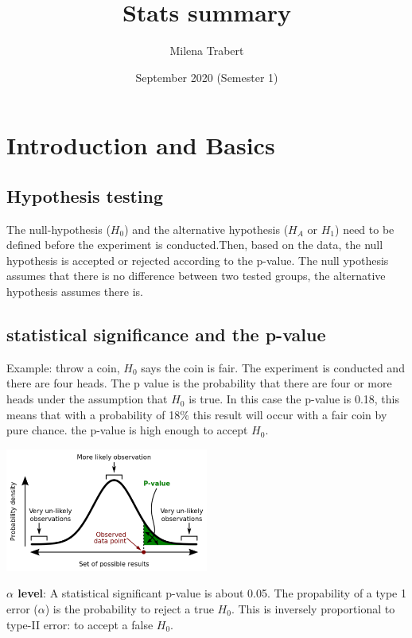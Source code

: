 \documentclass{article}
\title{Stats summary}
\author{Milena Trabert}
\date{September 2020 (Semester 1)}
\begin{document}
\maketitle
\tableofcontents
\newpage

\section{Introduction and Basics}
\subsection{Hypothesis testing}
The null-hypothesis ($H_0$) and the alternative hypothesis ($H_A$ or $H_1$) need to be defined before the experiment is conducted.Then, based on the data, the null hypothesis is accepted or rejected according to the p-value. The null ypothesis assumes that there is no difference between two tested groups, the alternative hypothesis assumes there is.
\subsection{statistical significance and the p-value}
Example: throw a coin, $H_0$ says the coin is fair. The experiment is conducted and there are four heads. The p value is the probability that there are four or more heads under the assumption that $H_0$ is true. In this case the p-value is 0.18, this means that with a probability of 18\% this result will occur with a fair coin by pure chance. the p-value is high enough to accept $H_0$.
\begin{center}
    \includegraphics[width=0.5\textwidth]{intro/p-value.png}
\end{center}
\textbf{$\alpha$ level}: A statistical significant p-value is about 0.05. The propability of a type 1 error ($\alpha$) is the probability to reject a true $H_0$. This is inversely proportional to type-II error: to accept a false $H_0$.
\end{document}
